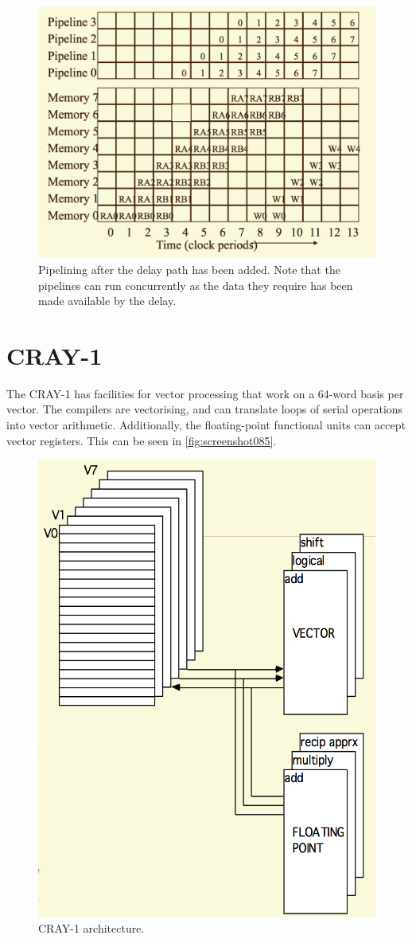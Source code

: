 \begin{figure}
\centering
\includegraphics[width=0.7\linewidth]{figures/screenshot084}
\caption[Delay path pipelining.]{Pipelining after the delay path has been added. Note that the pipelines can run concurrently as the data they require has been made available by the delay.}
\label{fig:screenshot084}
\end{figure}

\section{CRAY-1}
The CRAY-1 has facilities for vector processing that work on a 64-word basis per vector. The compilers are vectorising, and can translate loops of serial operations into vector arithmetic. Additionally, the floating-point functional units can accept vector registers. This can be seen in \autoref{fig:screenshot085}.

\begin{figure}
\centering
\includegraphics[width=0.7\linewidth]{figures/screenshot085}
\caption{CRAY-1 architecture.}
\label{fig:screenshot085}
\end{figure}

